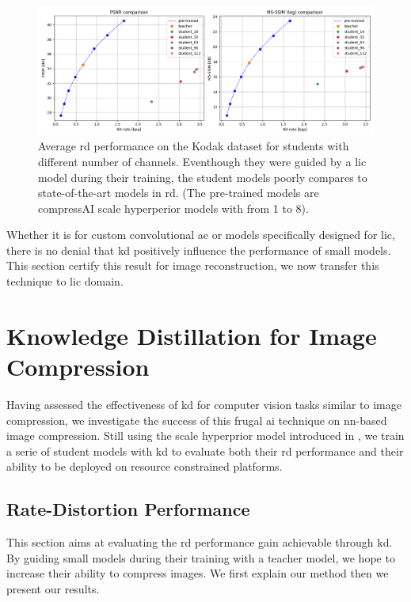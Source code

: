 \begin{figure}
    \centering
    \includegraphics[width=15cm]{../img/kd_ae_rd.png}
    \caption[Average \acrshort{rd} performance on the Kodak dataset for students with different number of channels.]{Average \acrshort{rd} performance on the Kodak dataset for students with different number of channels. Eventhough they were guided by a \acrshort{lic} model during their training, the student models poorly compares to state-of-the-art models in \acrshort{rd}. (The pre-trained models are compressAI scale hyperperior models with  from 1 to 8).}
    \label{kd_ae_2}
\end{figure}

Whether it is for custom convolutional \acrshort{ae} or models specifically designed for \acrshort{lic}, there is no denial that \acrshort{kd} positively influence the performance of small models. This section certify this result for image reconstruction, we now transfer this technique to \acrshort{lic} domain.

\section{Knowledge Distillation for Image Compression}
Having assessed the effectiveness of \acrshort{kd} for computer vision tasks similar to image compression, we investigate the success of this frugal \acrshort{ai} technique on \acrshort{nn}-based image compression. Still using the scale hyperprior model introduced in \cite{ballé2018variationalimagecompressionscale}, we train a serie of student models with \acrshort{kd} to evaluate both their \acrshort{rd} performance and their ability to be deployed on resource constrained platforms.

\subsection{Rate-Distortion Performance}
This section aims at evaluating the \acrshort{rd} performance gain achievable through \acrshort{kd}. By guiding small models during their training with a teacher model, we hope to increase their ability to compress images. We first explain our method then we present our results.

